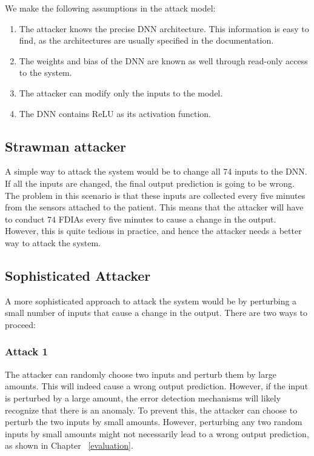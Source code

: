 We make the following assumptions in the attack model:
\begin{enumerate}
	\item The attacker knows the precise \ac{DNN}  architecture. This information is easy to find, as the architectures are  usually specified in the  documentation. 
	\item  The weights and bias of the \ac{DNN}  are known as well through read-only access to the system.  
	\item The attacker can modify only the inputs to the model.
	\item The \ac{DNN} contains ReLU as its activation function. 
\end{enumerate}

\subsection{Strawman attacker}
A simple way to attack the system would be to change all 74 inputs to the DNN.
 If all the inputs are changed, the final output prediction is going to be wrong. The problem in this  scenario is that 
 these inputs are collected every five minutes from the sensors attached to the patient. 
 This means that the attacker will have to conduct $74$ FDIAs every five minutes to cause a change in the output. 
 However, this is quite tedious in practice, and hence the attacker needs a better way to attack the system. 

\subsection{Sophisticated Attacker}
A more sophisticated approach to attack the system would be by perturbing a small number of inputs that cause a change in the output. 
There are two ways to proceed:

\subsubsection{Attack 1}
The attacker can randomly choose two inputs and perturb them by large amounts. 
This will indeed cause a wrong output prediction. 
However, if the input is perturbed by a large amount, the error detection mechanisms will likely recognize that there is an anomaly. 
To prevent this, the attacker can choose to perturb the two inputs by small amounts. 
However, perturbing any two random inputs by small amounts might not necessarily lead to a wrong output prediction, as shown in Chapter ~\ref{evaluation}. 

